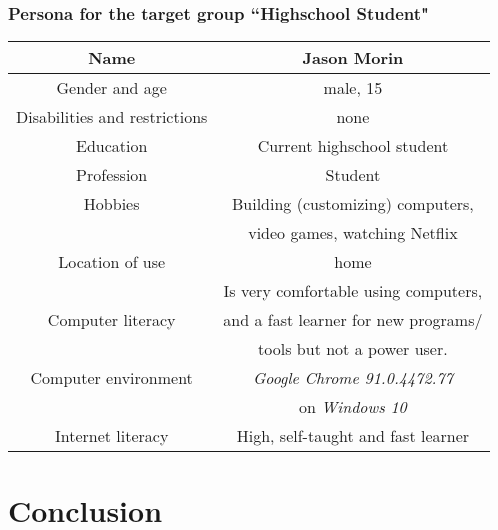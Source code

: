 \documentclass{beamer}
\begin{document}
\begin{frame}
    \frametitle{Persona for the target group ``Highschool Student"}
    \begin{tabular}{ |c|c| } 
        \hline
        Name                          & Jason Morin                          \\ \hline
        Gender and age                & male, 15                             \\ \hline
        Disabilities and restrictions & none                                 \\ \hline
        Education                     & Current highschool student           \\ \hline
        Profession                    & Student                              \\ \hline
        Hobbies                       & Building (customizing) computers,    \\ 
                                      & video games, watching Netflix        \\ \hline
        Location of use               & home                                 \\ \hline
                                      & Is very comfortable using computers, \\
        Computer literacy             & and a fast learner for new programs/ \\
                                      & tools but not a power user.          \\ \hline
        Computer environment          & \textit{Google Chrome 91.0.4472.77}  \\ 
                                      & on \textit{Windows 10}               \\ \hline
        Internet literacy             & High, self-taught and fast learner   \\ \hline
    \end{tabular}
\end{frame}


\section{Conclusion}
\end{document}
